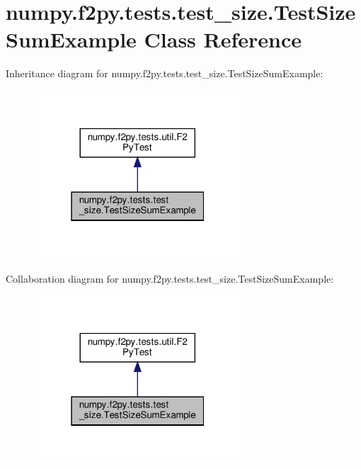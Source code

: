 \hypertarget{classnumpy_1_1f2py_1_1tests_1_1test__size_1_1TestSizeSumExample}{}\section{numpy.\+f2py.\+tests.\+test\+\_\+size.\+Test\+Size\+Sum\+Example Class Reference}
\label{classnumpy_1_1f2py_1_1tests_1_1test__size_1_1TestSizeSumExample}


Inheritance diagram for numpy.\+f2py.\+tests.\+test\+\_\+size.\+Test\+Size\+Sum\+Example\+:
\nopagebreak
\begin{figure}[H]
\begin{center}
\leavevmode
\includegraphics[width=220pt]{classnumpy_1_1f2py_1_1tests_1_1test__size_1_1TestSizeSumExample__inherit__graph}
\end{center}
\end{figure}


Collaboration diagram for numpy.\+f2py.\+tests.\+test\+\_\+size.\+Test\+Size\+Sum\+Example\+:
\nopagebreak
\begin{figure}[H]
\begin{center}
\leavevmode
\includegraphics[width=220pt]{classnumpy_1_1f2py_1_1tests_1_1test__size_1_1TestSizeSumExample__coll__graph}
\end{center}
\end{figure}
